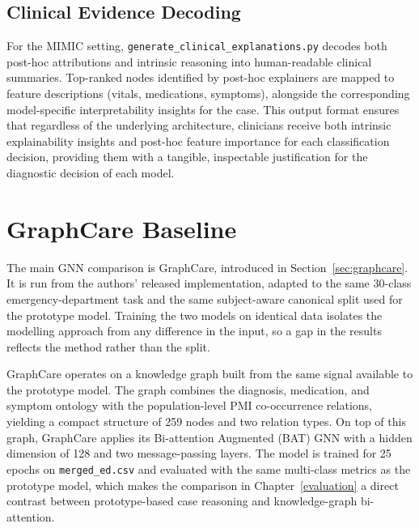 \subsection{Clinical Evidence Decoding}

For the MIMIC setting, \texttt{generate\_clinical\_explanations.py} decodes both post-hoc attributions and intrinsic reasoning into human-readable clinical summaries. Top-ranked nodes identified by post-hoc explainers are mapped to feature descriptions (vitals, medications, symptoms), alongside the corresponding model-specific interpretability insights for the case.  This output format ensures that regardless of the underlying architecture, clinicians receive both intrinsic explainability insights and post-hoc feature importance for each classification decision, providing them with a tangible, inspectable justification for the diagnostic decision of each model.

\section{GraphCare Baseline}
\label{sec:graphcare-impl}

The main GNN comparison is GraphCare, introduced in
Section~\ref{sec:graphcare}. It is run from the authors' released
implementation, adapted to the same 30-class emergency-department task and the
same subject-aware canonical split used for the prototype model. Training the
two models on identical data isolates the modelling approach from any difference
in the input, so a gap in the results reflects the method rather than the split.

GraphCare operates on a knowledge graph built from the same signal available to
the prototype model. The graph combines the diagnosis, medication, and symptom
ontology with the population-level PMI co-occurrence relations, yielding a
compact structure of 259 nodes and two relation types. On top of this graph,
GraphCare applies its Bi-attention Augmented (BAT) GNN with a hidden dimension of
128 and two message-passing layers. The model is trained for 25 epochs on
\texttt{merged\_ed.csv} and evaluated with the same multi-class metrics as the
prototype model, which makes the comparison in Chapter~\ref{evaluation} a direct
contrast between prototype-based case reasoning and knowledge-graph
bi-attention.


